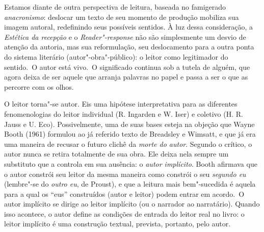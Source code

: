 Estamos diante de outra perspectiva de leitura, baseada no famigerado
\emph{anacronismo}: deslocar um texto de seu momento de produção
mobiliza sua imagem autoral, redefinindo seus possíveis sentidos. À luz
dessa consideração, a \emph{Estética da recepção} e
o \emph{Reader"-response} não são simplesmente um desvio de atenção da
autoria, mas sua reformulação, seu deslocamento para a outra ponta do
sistema literário (autor"-obra"-público): o leitor como legitimador do
sentido.~O autor está vivo.~O significado continua sob a tutela de
alguém, que agora deixa de ser aquele que arranja palavras no papel e
passa a ser o que as percorre com os olhos.

O leitor torna"-se autor. Eis uma hipótese interpretativa para as
diferentes fenomenologias do leitor individual (R. Ingarden e W. Iser) e
coletivo (H. R. Jauss e U. Eco). Possivelmente, uma de suas bases esteja
na objeção que Wayne Booth (1961) formulou ao já referido texto de
Breadsley e Wimsatt, e que já era uma maneira de recusar o futuro clichê
da \emph{morte do autor}. Segundo o crítico, o autor nunca se retira
totalmente de sua obra. Ele deixa nela sempre um substituto que a
controla em sua ausência: o \emph{autor implícito}. Booth afirmava que o
autor constrói seu leitor da mesma maneira como constrói o
seu \emph{segundo eu} (lembre"-se do \emph{outro eu}, de Proust), e que a
leitura mais bem"-sucedida é aquela para a qual os ``eus'' construídos
(autor e leitor) podem entrar em acordo.~O autor implícito se dirige ao
leitor implícito (ou o narrador ao narratário). Quando isso acontece, o
autor define as condições de entrada do leitor real no livro: o leitor
implícito é uma construção textual, prevista, portanto, pelo autor.


